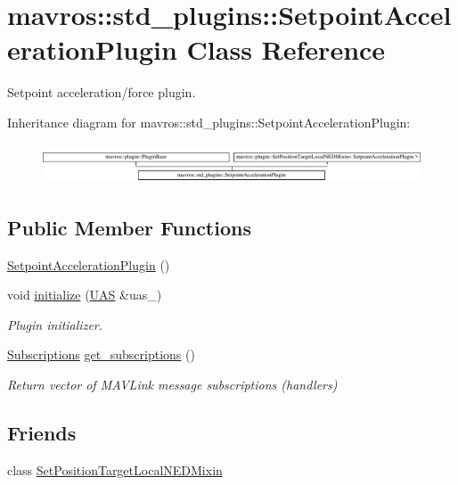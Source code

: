 \hypertarget{classmavros_1_1std__plugins_1_1SetpointAccelerationPlugin}{}\section{mavros\+::std\+\_\+plugins\+::Setpoint\+Acceleration\+Plugin Class Reference}
\label{classmavros_1_1std__plugins_1_1SetpointAccelerationPlugin}


Setpoint acceleration/force plugin.  


Inheritance diagram for mavros\+::std\+\_\+plugins\+::Setpoint\+Acceleration\+Plugin\+:\begin{figure}[H]
\begin{center}
\leavevmode
\includegraphics[height=1.196581cm]{classmavros_1_1std__plugins_1_1SetpointAccelerationPlugin}
\end{center}
\end{figure}
\subsection*{Public Member Functions}
\begin{DoxyCompactItemize}
\item 
\mbox{\hyperlink{group__plugin_gadb07b9fc791c21aa306f0f5a92533eef}{Setpoint\+Acceleration\+Plugin}} ()
\item 
void \mbox{\hyperlink{group__plugin_gaff69fabd330e14673218e9a83b314ba6}{initialize}} (\mbox{\hyperlink{classmavros_1_1UAS}{U\+AS}} \&uas\+\_\+)
\begin{DoxyCompactList}\small\item\em Plugin initializer. \end{DoxyCompactList}\item 
\mbox{\hyperlink{group__plugin_ga8967d61fc77040e0c3ea5a4585d62a09}{Subscriptions}} \mbox{\hyperlink{group__plugin_ga07ccc1eddfa34ce64d9d61c1255ace1c}{get\+\_\+subscriptions}} ()
\begin{DoxyCompactList}\small\item\em Return vector of M\+A\+V\+Link message subscriptions (handlers) \end{DoxyCompactList}\end{DoxyCompactItemize}
\subsection*{Friends}
\begin{DoxyCompactItemize}
\item 
class \mbox{\hyperlink{group__plugin_gac6cc7d4f0f89ffc59d03574a47983861}{Set\+Position\+Target\+Local\+N\+E\+D\+Mixin}}
\end{DoxyCompactItemize}
